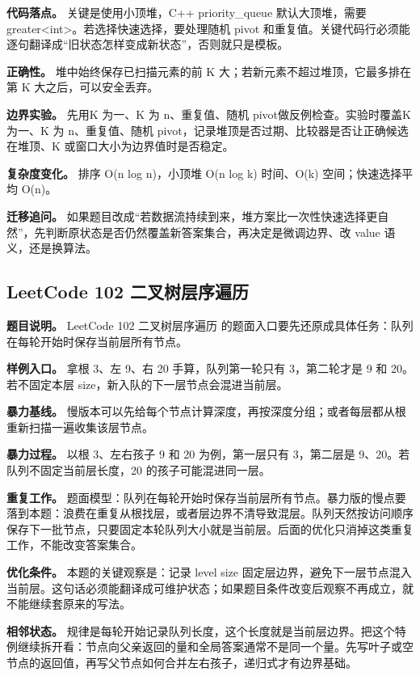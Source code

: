 \textbf{代码落点。} 关键是使用小顶堆，C++ priority\_queue 默认大顶堆，需要 greater<int>。若选择快速选择，要处理随机 pivot 和重复值。关键代码行必须能逐句翻译成“旧状态怎样变成新状态”，否则就只是模板。

\textbf{正确性。} 堆中始终保存已扫描元素的前 K 大；若新元素不超过堆顶，它最多排在第 K 大之后，可以安全丢弃。

\textbf{边界实验。} 先用K 为一、K 为 n、重复值、随机 pivot做反例检查。实验时覆盖K 为一、K 为 n、重复值、随机 pivot，记录堆顶是否过期、比较器是否让正确候选在堆顶、K 或窗口大小为边界值时是否稳定。

\textbf{复杂度变化。} 排序 O(n log n)，小顶堆 O(n log k) 时间、O(k) 空间；快速选择平均 O(n)。

\textbf{迁移追问。} 如果题目改成“若数据流持续到来，堆方案比一次性快速选择更自然”，先判断原状态是否仍然覆盖新答案集合，再决定是微调边界、改 value 语义，还是换算法。

\subsection{LeetCode 102 二叉树层序遍历}

\textbf{题目说明。} LeetCode 102 二叉树层序遍历 的题面入口要先还原成具体任务：队列在每轮开始时保存当前层所有节点。

\textbf{样例入口。} 拿根 3、左 9、右 20 手算，队列第一轮只有 3，第二轮才是 9 和 20。若不固定本层 size，新入队的下一层节点会混进当前层。

\textbf{暴力基线。} 慢版本可以先给每个节点计算深度，再按深度分组；或者每层都从根重新扫描一遍收集该层节点。

\textbf{暴力过程。} 以根 3、左右孩子 9 和 20 为例，第一层只有 3，第二层是 9、20。若队列不固定当前层长度，20 的孩子可能混进同一层。

\textbf{重复工作。} 题面模型：队列在每轮开始时保存当前层所有节点。暴力版的慢点要落到本题：浪费在重复从根找层，或者层边界不清导致混层。队列天然按访问顺序保存下一批节点，只要固定本轮队列大小就是当前层。后面的优化只消掉这类重复工作，不能改变答案集合。

\textbf{优化条件。} 本题的关键观察是：记录 level size 固定层边界，避免下一层节点混入当前层。这句话必须能翻译成可维护状态；如果题目条件改变后观察不再成立，就不能继续套原来的写法。

\textbf{相邻状态。} 规律是每轮开始记录队列长度，这个长度就是当前层边界。把这个特例继续拆开看：节点向父亲返回的量和全局答案通常不是同一个量。先写叶子或空节点的返回值，再写父节点如何合并左右孩子，递归式才有边界基础。


